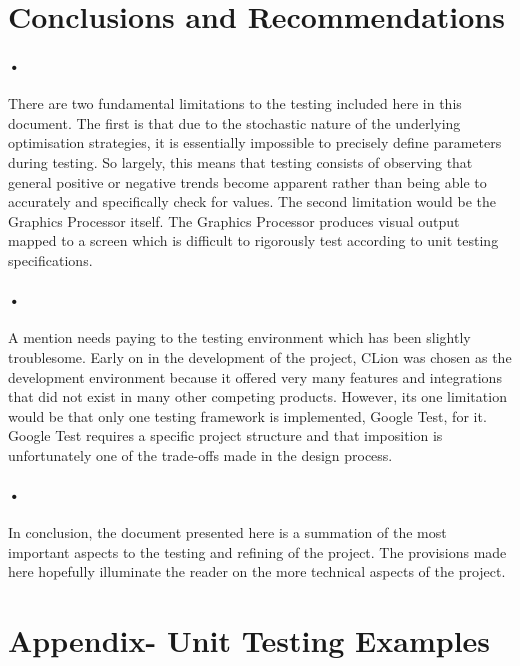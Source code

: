 \documentclass[11pt]{article}
\begin{document}
\section{Conclusions and Recommendations}
\paragraph{•}
There are two fundamental limitations to the testing included here in this document. The first is that due to the stochastic nature of the underlying optimisation strategies, it is essentially impossible to precisely define parameters during testing. So largely, this means that testing consists of observing that general positive or negative trends become apparent rather than being able to accurately and specifically check for values. The second limitation would be the Graphics Processor itself. The Graphics Processor produces visual output mapped to a screen which is difficult to rigorously test according to unit testing specifications. 
\paragraph{•}
A mention needs paying to the testing environment which has been slightly troublesome. Early on in the development of the project, CLion was chosen as the development environment because it offered very many features and integrations that did not exist in many other competing products. However, its one limitation would be that only one testing framework is implemented, Google Test, for it. Google Test requires a specific project structure and that imposition is unfortunately one of the trade-offs made in the design process.

\paragraph{•}
In conclusion, the document presented here is a summation of the most important aspects to the testing and refining of the project. The provisions made here hopefully illuminate the reader on the more technical aspects of the project.

\section{Appendix- Unit Testing Examples}
\end{document}

